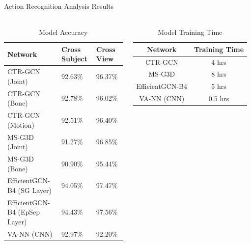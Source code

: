 \documentclass[aspectratio=169]{beamer}
\begin{document}
\begin{frame}{Action Recognition Analysis Results}
      \framesubtitle{}%
      
      \begin{columns}
      \begin{table}[h!]
      \centering
      {\small
      \begin{tabular}{ |C{0.35\textwidth}|C{0.25\textwidth}|C{0.2\textwidth}| } 
              \hline
              Network & Cross Subject & Cross View \\ 
              \hline
              CTR-GCN (Joint) & 92.63\% & 96.37\% \\ 
              \hline
              CTR-GCN (Bone) & 92.78\% & 96.02\% \\ 
              \hline
              CTR-GCN (Motion) & 92.51\% & 96.40\% \\ 
              \hline
              MS-G3D (Joint) & 91.27\% & 96.85\% \\ 
              \hline
              MS-G3D (Bone) & 90.90\% & 95.44\% \\ 
              \hline
              EfficientGCN-B4 (SG Layer) & 94.05\% & 97.47\% \\ 
              \hline
              EfficientGCN-B4 (EpSep Layer) & 94.43\% & 97.56\% \\ 
              \hline
              VA-NN (CNN) & 92.97\% & 92.20\% \\
              \hline
      \end{tabular}
      }
      \caption{Model Accuracy}
      \end{table}
      
      \begin{table}[h!]
      \centering
      {\small
      \begin{tabular}{ |c|c| }
              \hline
              Network & Training Time \\
              \hline
              CTR-GCN & 4 hrs\\
              \hline
              MS-G3D & 8 hrs\\
              \hline
              EfficientGCN-B4 & 5 hrs\\
              \hline
              VA-NN (CNN) & 0.5 hrs\\
              \hline
      \end{tabular}
      }
      \caption{Model Training Time}     
      \end{table}
      \end{columns}
\end{frame}
\end{document}
